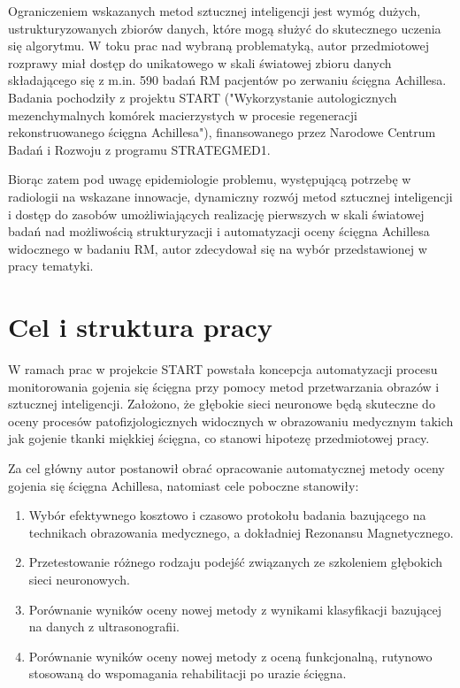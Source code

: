 Ograniczeniem wskazanych metod sztucznej inteligencji jest wymóg dużych, \linebreak ustrukturyzowanych zbiorów danych, które mogą służyć do skutecznego uczenia się algorytmu. W toku prac nad wybraną problematyką, autor przedmiotowej rozprawy miał dostęp do unikatowego w skali światowej zbioru danych składającego się \linebreak z m.in. 590 badań RM pacjentów po zerwaniu ścięgna Achillesa. Badania pochodziły z projektu START ("Wykorzystanie autologicznych mezenchymalnych komórek macierzystych w procesie regeneracji rekonstruowanego ścięgna Achillesa"), finansowanego przez Narodowe Centrum Badań i Rozwoju z programu STRATEGMED1.

Biorąc zatem pod uwagę epidemiologie problemu, występującą potrzebę w radiologii na wskazane innowacje, dynamiczny rozwój metod sztucznej inteligencji \linebreak i dostęp do zasobów umożliwiających realizację pierwszych w skali światowej badań nad możliwością strukturyzacji i automatyzacji oceny ścięgna Achillesa widocznego w badaniu RM, autor zdecydował się na wybór przedstawionej w pracy tematyki.  
 

{\let\clearpage\relax\chapter*{Cel i struktura pracy}}

W ramach prac w projekcie START powstała koncepcja automatyzacji procesu monitorowania gojenia się ścięgna przy pomocy metod przetwarzania obrazów \linebreak i sztucznej inteligencji. Założono, że głębokie sieci neuronowe będą skuteczne do oceny procesów patofizjologicznych widocznych w obrazowaniu medycznym takich jak gojenie tkanki miękkiej ścięgna, co stanowi hipotezę przedmiotowej pracy.

Za cel główny autor postanowił obrać opracowanie automatycznej metody oceny gojenia się ścięgna Achillesa, natomiast cele poboczne stanowiły:
\begin{enumerate}
	\item Wybór efektywnego kosztowo i czasowo protokołu badania bazującego na technikach obrazowania medycznego, a dokładniej Rezonansu Magnetycznego.
	\item Przetestowanie różnego rodzaju podejść związanych ze szkoleniem głębokich sieci neuronowych.
	\item Porównanie wyników oceny nowej metody z wynikami klasyfikacji bazującej na danych z ultrasonografii.
	\item Porównanie wyników oceny nowej metody z oceną funkcjonalną, rutynowo stosowaną do wspomagania rehabilitacji po urazie ścięgna.
\end{enumerate}

